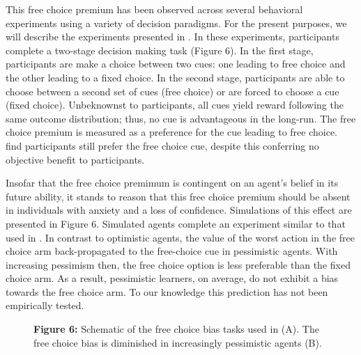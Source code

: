 \documentclass[11pt]{article} %
\begin{document}
This free choice premium has been observed across several behavioral experiments \citep{Suzuki1997, Leotti2011, Leotti2014, Cockburn2014} using a variety of decision paradigms. For the present purposes, we will describe the experiments presented in \citep{Leotti2011, Leotti2014}. In these experiments, participants complete a two-stage decision making task (Figure 6). In the first stage, participants are make a choice between two cues: one leading to free choice and the other leading to a fixed choice. In the second stage, participants are able to choose between a second set of cues (free choice) or are forced to choose a cue (fixed choice). Unbeknownst to participants, all cues yield reward following the same outcome distribution; thus, no cue is advantageous in the long-run. The free choice premium is measured as a preference for the cue leading to free choice. \cite{Leotti2011, Leotti2014} find participants still prefer the free choice cue, despite this conferring no objective benefit to participants.

Insofar that the free choice premimum is contingent on an agent's belief in its future ability, it stands to reason that this free choice premium should be absent in individuals with anxiety and a loss of confidence. Simulations of this effect are presented in Figure 6. Simulated agents complete an experiment similar to that used in \cite{Leotti2011, Leotti2014}. In contrast to optimistic agents, the value of the worst action in the free choice arm back-propagated to the free-choice cue in pessimistic agents. With increasing pessimism then, the free choice option is less preferable than the fixed choice arm. As a result, pessimistic learners, on average, do not exhibit a bias towards the free choice arm. To our knowledge this prediction has not been empirically tested.

\begin{figure}
  \centerline{%
  }
  \par \textbf{Figure 6:} Schematic of the free choice bias tasks used in \cite{Leotti2011, Leotti2014} (A). The free choice bias is diminished in increasingly pessimistic agents (B).
\end{figure}
\end{document}
